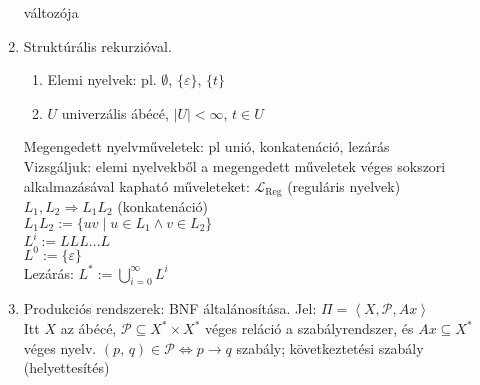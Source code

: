 \documentclass[fleqn,10pt,a4paper]{article}
\newcommand{\nn}{\Rightarrow}
\newcommand{\di}{\displaystyle}
\renewcommand{\epsilon}{\varepsilon}
\newcommand{\listazjromai}{
  \renewcommand{\theenumi}{\roman{enumi}}
  \renewcommand{\labelenumi}{(\theenumi)}
}
\newenvironment{enumzjromai}{\listazjromai\begin{enumerate}}{\end{enumerate}}
\newenvironment{enumzjr}{\begin{enumzjromai}}{\end{enumzjromai}}
\theoremstyle{magyar}
\newcommand{\Lang}{\mathcal{L}}
\newcommand{\LangReg}{\Lang_{\text{Reg}}}
\begin{document}
\begin{enumerate}
    változója
  \item Struktúrális rekurzióval.
    \begin{enumzjr}
    \item Elemi nyelvek: pl. $\emptyset$, $\{\epsilon\}$, $\{t\}$
    \item $U$ univerzális ábécé, $|U| < \infty$, $t\in U$
    \end{enumzjr}
    Megengedett nyelvműveletek: pl { unió, konkatenáció, lezárás }\\
    Vizsgáljuk: elemi nyelvekből a megengedett műveletek véges sokszori alkalmazásával kapható műveleteket:
    $\LangReg$ (reguláris nyelvek)\\
    $L_1,L_2\nn L_1 L_2$ (konkatenáció)\\
    $L_1 L_2 := \{ uv \mid u \in L_1 \land v\in L_2\}$\\
    $L^i := L L L\ldots L$\\
    $L^0 := \{ \epsilon \}$\\
    Lezárás: $L^* := \di\bigcup_{i=0}^\infty L^i$
  \item Produkciós rendszerek: BNF általánosítása. Jel:
    $\Pi = \left< X, \mathcal P, Ax \right>$\\
    Itt $X$ az ábécé, $ \mathcal P\subseteq X^*\times X^*$ véges reláció a szabályrendszer, és $Ax\subseteq X^*$ véges
    nyelv.
    $(p,\, q)\in \mathcal P \iff p\to q$ szabály; következtetési szabály (helyettesítés)
  \end{enumerate}
\end{document}
